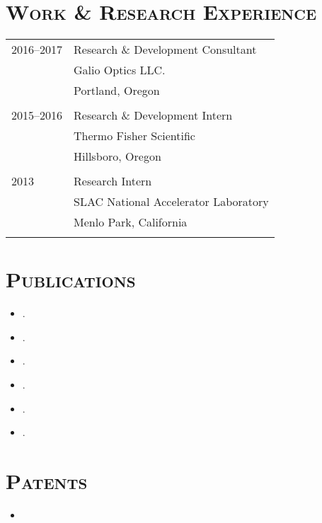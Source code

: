 \section*{\textsc{Work \& Research Experience}}
\begin{tabular}{p{}l}
    2016--2017 & Research \& Development Consultant \\
               & Galio Optics LLC. \\
               & Portland, Oregon \\
    \\
    2015--2016 & Research \& Development Intern \\
               & Thermo Fisher Scientific \\
               & Hillsboro, Oregon \\
    \\
    2013       & Research Intern \\
               & SLAC National Accelerator Laboratory \\
               & Menlo Park, California \\
    \\
\end{tabular}


\section*{\textsc{Publications}}
\begin{itemize}[label={}]
    \item {}.
    \item {}.
    \item {}.
    \item {}.
    \item {}.
    \item {}.
\end{itemize}



\section*{\textsc{Patents}}
\begin{itemize}[label={}]
        \item {}
\end{itemize}

